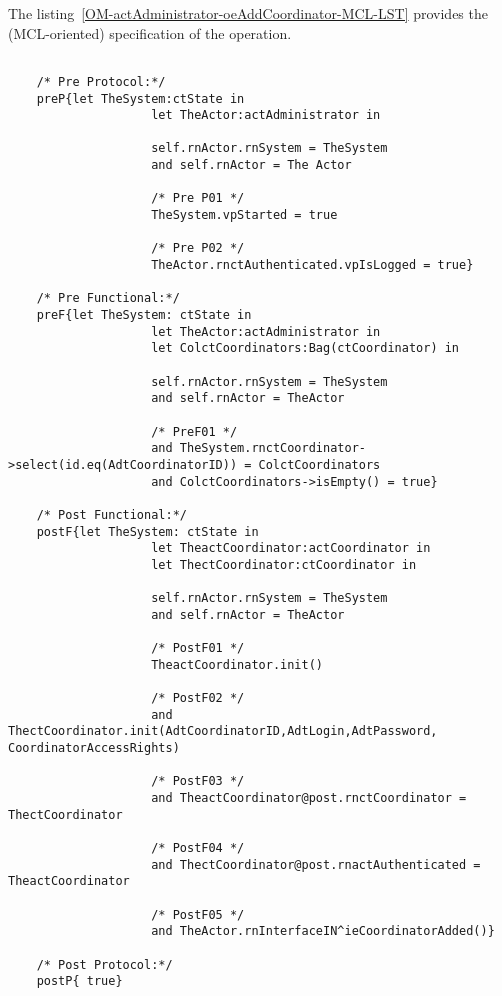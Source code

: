 	\vspace{1cm}
	The listing~\ref{OM-actAdministrator-oeAddCoordinator-MCL-LST} provides the \msrmessir (MCL-oriented) specification of the operation.
	
	\scriptsize
	\vspace{0.5cm}
	\begin{lstlisting}[style=MessirStyle,firstnumber=auto,captionpos=b,caption={\msrmessir (MCL-oriented) specification of the operation \emph{oeAddCoordinator}.},label=OM-actAdministrator-oeAddCoordinator-MCL-LST]

	/* Pre Protocol:*/ 
	preP{let TheSystem:ctState in
					let TheActor:actAdministrator in
					
					self.rnActor.rnSystem = TheSystem
					and self.rnActor = The Actor
					
					/* Pre P01 */
					TheSystem.vpStarted = true
					
					/* Pre P02 */
					TheActor.rnctAuthenticated.vpIsLogged = true}
	
	/* Pre Functional:*/
	preF{let TheSystem: ctState in
					let TheActor:actAdministrator in
					let ColctCoordinators:Bag(ctCoordinator) in
					
					self.rnActor.rnSystem = TheSystem
					and self.rnActor = TheActor
					
					/* PreF01 */
					and TheSystem.rnctCoordinator->select(id.eq(AdtCoordinatorID)) = ColctCoordinators
					and ColctCoordinators->isEmpty() = true}
	
	/* Post Functional:*/ 
	postF{let TheSystem: ctState in
					let TheactCoordinator:actCoordinator in
					let ThectCoordinator:ctCoordinator in
					
					self.rnActor.rnSystem = TheSystem
					and self.rnActor = TheActor
					
					/* PostF01 */
					TheactCoordinator.init()
					
					/* PostF02 */
					and ThectCoordinator.init(AdtCoordinatorID,AdtLogin,AdtPassword, CoordinatorAccessRights)
					
					/* PostF03 */
					and TheactCoordinator@post.rnctCoordinator = ThectCoordinator
					
					/* PostF04 */
					and ThectCoordinator@post.rnactAuthenticated = TheactCoordinator
					
					/* PostF05 */
					and TheActor.rnInterfaceIN^ieCoordinatorAdded()}
	
	/* Post Protocol:*/ 
	postP{ true}
	
	\end{lstlisting}
	\normalsize 
	
	
	
	





